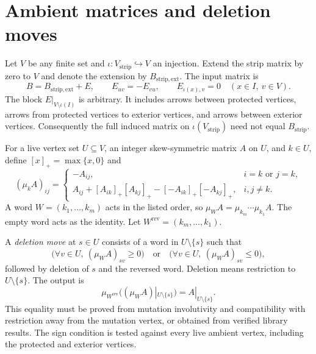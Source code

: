 \documentclass[11pt,a4paper]{article}
\newcommand{\strip}{\mathrm{strip}}
\newcommand{\pos}[1]{[#1]_+}
\begin{document}
\newpage
\section{Ambient matrices and deletion moves}
Let $V$ be any finite set and $\iota:V_{\strip}\hookrightarrow V$ an injection.
Extend the strip matrix by zero to $V$ and denote the extension by
$B_{\strip,\mathrm{ext}}$. The input matrix is
\begin{equation}\label{eq:ambient}
 B=B_{\strip,\mathrm{ext}}+E,\qquad
 E_{uv}=-E_{vu},\qquad
 E_{\iota(x),v}=0\quad(x\in I,\ v\in V).
\end{equation}
The block $E|_{V\setminus\iota(I)}$ is arbitrary. It includes arrows between
protected vertices, arrows from protected vertices to exterior vertices,
and arrows between exterior vertices. Consequently the full induced matrix
on $\iota(V_{\strip})$ need not equal $B_{\strip}$.

For a live vertex set $U\subseteq V$, an integer skew-symmetric matrix $A$
on $U$, and $k\in U$, define $\pos{x}=\max\{x,0\}$ and
\begin{equation}\label{eq:mutation}
 (\mu_k A)_{ij}=\begin{cases}
 -A_{ij},&i=k\text{ or }j=k,\\
 A_{ij}+\pos{A_{ik}}\pos{A_{kj}}-
             \pos{-A_{ik}}\pos{-A_{kj}},&i,j\ne k.
 \end{cases}
\end{equation}
A word $W=(k_1,\ldots,k_m)$ acts in the listed order, so
$\mu_W A=\mu_{k_m}\cdots\mu_{k_1}A$. The empty word acts as the identity.
Let $W^{\mathrm{rev}}=(k_m,\ldots,k_1)$.

A \emph{deletion move} at $s\in U$ consists of a word in $U\setminus\{s\}$
such that
\begin{equation}\label{eq:sign}
 \bigl(\forall v\in U,\ (\mu_W A)_{sv}\ge0\bigr)
 \quad\text{or}\quad
 \bigl(\forall v\in U,\ (\mu_W A)_{sv}\le0\bigr),
\end{equation}
followed by deletion of $s$ and the reversed word. Deletion means restriction
to $U\setminus\{s\}$. The output is
\begin{equation}\label{eq:undo}
 \mu_{W^{\mathrm{rev}}}
 \bigl((\mu_W A)|_{U\setminus\{s\}}\bigr)
 =A|_{U\setminus\{s\}}.
\end{equation}
This equality must be proved from mutation involutivity and compatibility
with restriction away from the mutation vertex, or obtained from verified
library results. The sign condition is tested against every live ambient
vertex, including the protected and exterior vertices.
\end{document}
